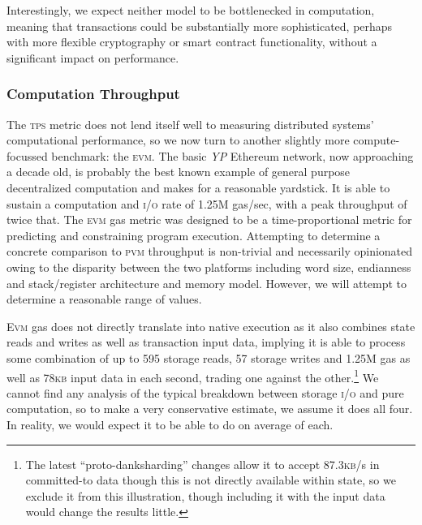 Interestingly, we expect neither model to be bottlenecked in computation, meaning that transactions could be substantially more sophisticated, perhaps with more flexible cryptography or smart contract functionality, without a significant impact on performance.

\subsubsection{Computation Throughput}

The \textsc{tps} metric does not lend itself well to measuring distributed systems' computational performance, so we now turn to another slightly more compute-focussed benchmark: the \textsc{evm}. The basic \emph{YP} Ethereum network, now approaching a decade old, is probably the best known example of general purpose decentralized computation and makes for a reasonable yardstick. It is able to sustain a computation and \textsc{i/o} rate of 1.25M gas/sec, with a peak throughput of twice that. The \textsc{evm} gas metric was designed to be a time-proportional metric for predicting and constraining program execution. Attempting to determine a concrete comparison to \textsc{pvm} throughput is non-trivial and necessarily opinionated owing to the disparity between the two platforms including word size, endianness and stack/register architecture and memory model. However, we will attempt to determine a reasonable range of values.

\textsc{Evm} gas does not directly translate into native execution as it also combines state reads and writes as well as transaction input data, implying it is able to process some combination of up to 595 storage reads, 57 storage writes and 1.25M gas as well as 78\textsc{kb} input data in each second, trading one against the other.\footnote{The latest ``proto-danksharding'' changes allow it to accept 87.3\textsc{kb}/s in committed-to data though this is not directly available within state, so we exclude it from this illustration, though including it with the input data would change the results little.} We cannot find any analysis of the typical breakdown between storage \textsc{i/o} and pure computation, so to make a very conservative estimate, we assume it does all four. In reality, we would expect it to be able to do on average  of each.

